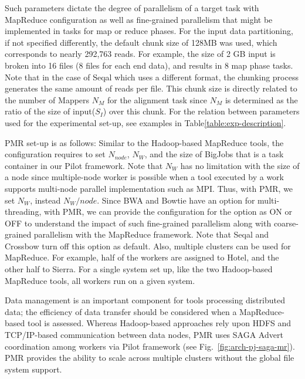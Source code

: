 \documentclass{acm_proc_article-sp}
\begin{document}
Such parameters dictate the degree of parallelism of a target task
with MapReduce configuration as well as fine-grained parallelism that
might be implemented in tasks for map or reduce phases.  For the input
data partitioning, if not specified differently, the default chunk
size of 128MB was used, which corresponds to nearly 292,763 reads.
For example, the size of 2 GB input is broken into 16 files (8 files
for each end data), and results in 8 map phase tasks.  Note that in
the case of Seqal which uses a different format, the chunking process
generates the same amount of reads per file.  This chunk size is
directly related to the number of Mappers $N_M$ for the alignment task
since $N_M$ is determined as the ratio of the size of input($S_I$)
over this chunk.  For the relation between parameters used for the
experimental set-up, see examples in Table\ref{table:exp-description}.

PMR set-up is as follows: Similar to the Hadoop-based MapReduce tools,
the configuration requires to set $N_{node}$, $N_W$, and the size of
BigJobs that is a task container in our Pilot
framework\cite{pmr2012,saga_bigjob_condor_cloud,pstar11}.  Note that
$N_W$ has no limitation with the size of a node since multiple-node
worker is possible when a tool executed by a work supports multi-node
parallel implementation such as MPI.  Thus, with PMR, we set $N_W$,
instead $N_{W}/node$.  Since BWA and Bowtie have an option for
multi-threading, with PMR, we can provide the configuration for the
option as ON or OFF to understand the impact of such fine-grained
parallelism along with coarse-grained parallelism with the MapReduce
framework.  Note that Seqal and Crossbow turn off this option as
default.  Also, multiple clusters can be used for MapReduce. For
example, half of the workers are assigned to Hotel, and the other half
to Sierra.  For a single system set up, like the two Hadoop-based
MapReduce tools, all workers run on a given system.

Data management is an important component for tools processing
distributed data; the efficiency of data transfer should be considered
when a MapReduce-based tool is assessed.  Whereas Hadoop-based
approaches rely upon HDFS and TCP/IP-based communication between data
nodes, PMR uses SAGA Advert coordination among workers via Pilot
framework (see Fig.~\ref{fig:arch-pj-saga-mr}).  PMR provides the
ability to scale across multiple clusters without the global file
system support.
 
\end{document}
